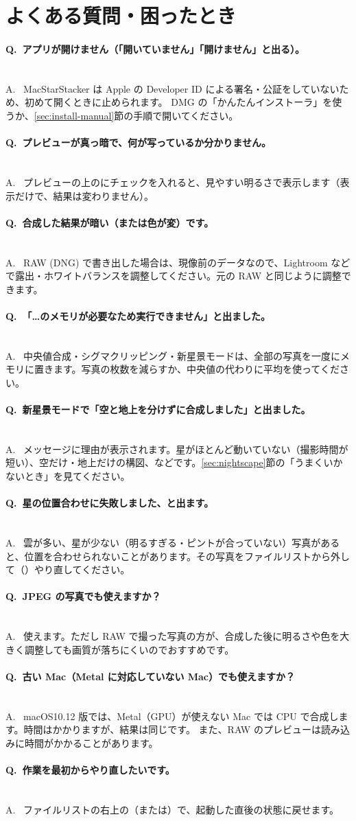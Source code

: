 \clearpage
\section{よくある質問・困ったとき}\label{sec:faq}

\newcommand\faq[2]{\paragraph{Q.\ #1}\mbox{}\\A.\ #2\par\medskip}

\faq{アプリが開けません（「開いていません」「開けません」と出る）。}{
MacStarStacker は Apple の Developer ID による署名・公証をしていないため、初めて開くときに止められます。
DMG の「かんたんインストーラ」を使うか、\ref{sec:install-manual}節の手順で開いてください。}

\faq{プレビューが真っ暗で、何が写っているか分かりません。}{
プレビューの上のにチェックを入れると、見やすい明るさで表示します（表示だけで、結果は変わりません）。}

\faq{合成した結果が暗い（または色が変）です。}{
RAW (DNG) で書き出した場合は、現像前のデータなので、Lightroom などで露出・ホワイトバランスを調整してください。元の RAW と同じように調整できます。}

\faq{「…のメモリが必要なため実行できません」と出ました。}{
中央値合成・シグマクリッピング・新星景モードは、全部の写真を一度にメモリに置きます。写真の枚数を減らすか、中央値の代わりに平均を使ってください。}

\faq{新星景モードで「空と地上を分けずに合成しました」と出ました。}{
メッセージに理由が表示されます。星がほとんど動いていない（撮影時間が短い）、空だけ・地上だけの構図、などです。\ref{sec:nightscape}節の「うまくいかないとき」を見てください。}

\faq{星の位置合わせに失敗しました、と出ます。}{
雲が多い、星が少ない（明るすぎる・ピントが合っていない）写真があると、位置を合わせられないことがあります。その写真をファイルリストから外して（\ui{×}）やり直してください。}

\faq{JPEG の写真でも使えますか？}{
使えます。ただし RAW で撮った写真の方が、合成した後に明るさや色を大きく調整しても画質が落ちにくいのでおすすめです。}

\faq{古い Mac（Metal に対応していない Mac）でも使えますか？}{
\textsf{macOS10.12} 版では、Metal（GPU）が使えない Mac では CPU で合成します。時間はかかりますが、結果は同じです。
また、RAW のプレビューは読み込みに時間がかかることがあります。}

\faq{作業を最初からやり直したいです。}{
ファイルリストの右上の（または\menu{編集 → すべてクリア…}）で、起動した直後の状態に戻せます。}
